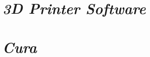 \documentclass[twoside,12pt,openright,final,english]{memoir}
\newif\ifsoftware\softwaretrue %
\newif\ifcura\curatrue %
\newif\ifslicer\slicerfalse %
\newif\iffirstprint\firstprintfalse %
\newif\ifglcd\glcdfalse %
\begin{document}
\ifsoftware
\chapter{\emph{3D Printer Software}}
\thispagestyle{empty}
{}
\fi

\ifcura
\chapter{\emph{Cura}}
\thispagestyle{empty}
{}
\fi

\begin{comment}
\ifslicer
\chapter{\emph{Slic3r}}
\thispagestyle{empty}
\markboth{Slic3r}{LulzBot\textsuperscript{\miniscule{\texttrademark}} Mini User Manual}
{}
\fi
\end{comment}


\iffirstprint
\chapter{\emph{Your First 3D Print}}
\label{firstprint}
\thispagestyle{empty}
\markboth{Your First 3D Print}{LulzBot\textsuperscript{\miniscule{\texttrademark}} Mini User Manual}
{}
\fi

\ifslicer
\chapter{\emph{Slic3r}}
\thispagestyle{empty}
\markboth{Slic3r}{LulzBot\textsuperscript{\miniscule{\texttrademark}} Mini User Manual}
{}
\fi

\ifglcd
\chapter{\emph{Printing with the Graphic LCD}}
\label{glcd}
\thispagestyle{empty}
\markboth{Printing with the Graphic LCD}{LulzBot\textsuperscript{\miniscule{\texttrademark}} Mini User Manual}
{}
\fi
\end{document}
